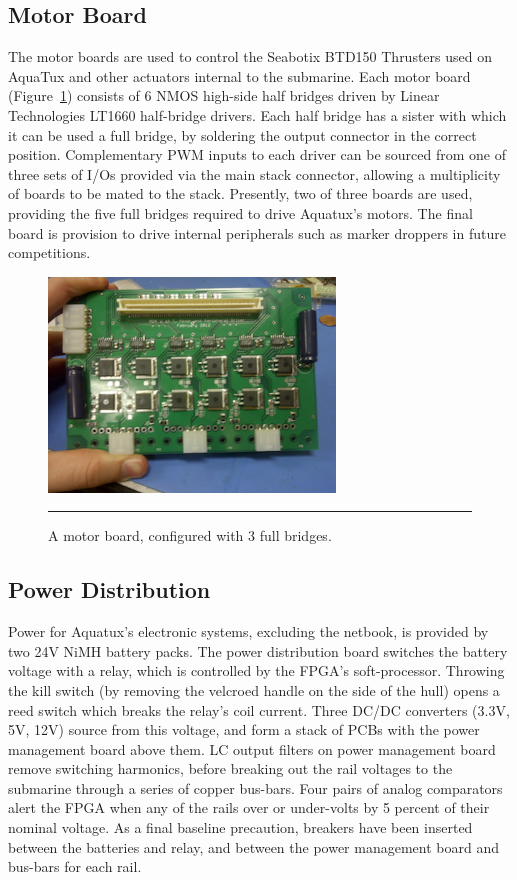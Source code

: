 \subsection{Motor Board}

The motor boards are used to control the Seabotix BTD150 Thrusters used on AquaTux 
and other actuators internal to the submarine. Each motor board (Figure~\ref{motorb}) consists of 6 NMOS 
high-side half bridges driven by Linear Technologies LT1660 half-bridge drivers. 
Each half bridge has a sister with which it can be used a full bridge, by soldering 
the output connector in the correct position. Complementary PWM inputs to each driver 
can be sourced from one of three sets of I/Os provided via the main stack connector, 
allowing a multiplicity of boards to be mated to the stack. Presently, two of three 
boards are used, providing the five full bridges required to drive Aquatux's motors. 
The final board is provision to drive internal peripherals such as marker droppers in 
future competitions.

\begin{figure}
\begin{center}
 \includegraphics[width=3in]{fig/motor_board.png} %
\vspace{.05in}
\hrule
\caption{A motor board, configured with 3 full bridges.}\label{motorb}
\end{center}
\end{figure}

\subsection{Power Distribution}
Power for Aquatux's electronic systems, excluding the netbook, is provided by 
two 24V NiMH battery packs. The power distribution board switches the battery 
voltage with a relay, which is controlled by the FPGA's soft-processor. 
Throwing the kill switch (by removing the velcroed handle on the side of the 
hull) opens a reed switch which breaks the relay's coil current. Three DC/DC 
converters (3.3V, 5V, 12V) source from this voltage, and form a stack of PCBs 
with the power management board above them. LC output filters on power management 
board remove switching harmonics, before breaking out the rail voltages to the 
submarine through a series of copper bus-bars. Four pairs of analog comparators 
alert the FPGA when any of the rails over or under-volts by 5 percent of their nominal 
voltage. As a final baseline precaution, breakers have been inserted between the 
batteries and relay, and between the power management board and bus-bars for each rail.

